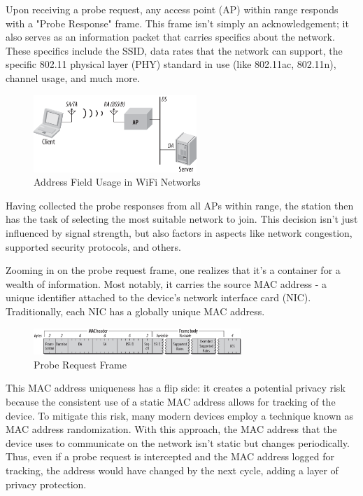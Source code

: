 \documentclass{article}
\begin{document}
Upon receiving a probe request, any access point (AP) within range responds with a "Probe Response" frame. This frame isn't simply an acknowledgement; it also serves as an information packet that carries specifics about the network. These specifics include the SSID, data rates that the network can support, the specific 802.11 physical layer (PHY) standard in use (like 802.11ac, 802.11n), channel usage, and much more. 

\begin{figure}[h]
    \centering
    \includegraphics[width=0.55\textwidth]{assets/address-field-usage.png}
    \caption{Address Field Usage in WiFi Networks}
    \label{fig:address-field}
\end{figure}

Having collected the probe responses from all APs within range, the station then has the task of selecting the most suitable network to join. This decision isn't just influenced by signal strength, but also factors in aspects like network congestion, supported security protocols, and others. 

Zooming in on the probe request frame, one realizes that it's a container for a wealth of information. Most notably, it carries the source MAC address - a unique identifier attached to the device's network interface card (NIC). Traditionally, each NIC has a globally unique MAC address.

\begin{figure}[h]
    \centering
    \includegraphics[width=0.7\textwidth]{assets/probe-request-frame.png}
    \caption{Probe Request Frame}
    \label{fig:probe-request-frame}
\end{figure}

This MAC address uniqueness has a flip side: it creates a potential privacy risk because the consistent use of a static MAC address allows for tracking of the device. To mitigate this risk, many modern devices employ a technique known as MAC address randomization. With this approach, the MAC address that the device uses to communicate on the network isn't static but changes periodically. Thus, even if a probe request is intercepted and the MAC address logged for tracking, the address would have changed by the next cycle, adding a layer of privacy protection.
\end{document}
